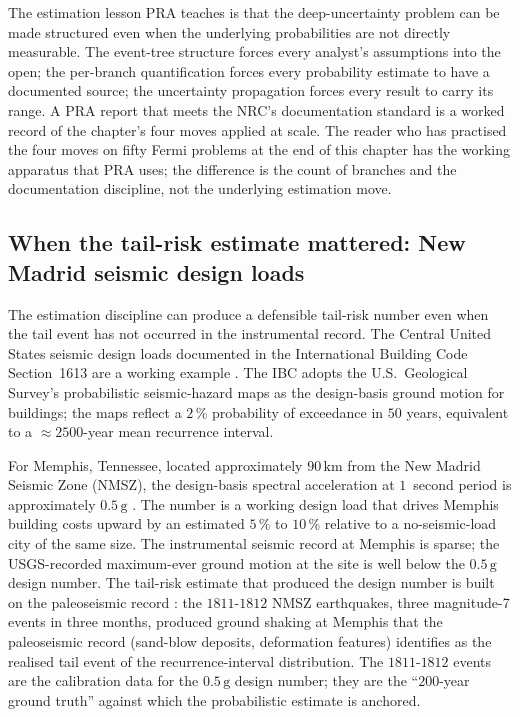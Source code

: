 The estimation lesson PRA teaches is that the deep-uncertainty
problem can be made structured even when the underlying
probabilities are not directly measurable. The event-tree
structure forces every analyst's assumptions into the open;
the per-branch quantification forces every probability
estimate to have a documented source; the uncertainty
propagation forces every result to carry its range. A PRA
report that meets the NRC's documentation standard is a
worked record of the chapter's four moves applied at scale.
The reader who has practised the four moves on fifty Fermi
problems at the end of this chapter has the working
apparatus that PRA uses; the difference is the count of
branches and the documentation discipline, not the underlying
estimation move.

\subsection{When the tail-risk estimate mattered: New Madrid
seismic design loads}

The estimation discipline can produce a defensible tail-risk
number even when the tail event has not occurred in the
instrumental record. The Central United States seismic
design loads documented in the International Building Code
Section~1613 are a working example
\cite{std:ch09t3-ibc-2018}. The IBC adopts the U.S.\
Geological Survey's probabilistic seismic-hazard maps as the
design-basis ground motion for buildings; the maps reflect a
$2\,\%$ probability of exceedance in $50$ years, equivalent
to a $\approx 2500$-year mean recurrence interval.

For Memphis, Tennessee, located approximately $90 \,\si{\kilo
\meter}$ from the New Madrid Seismic Zone (NMSZ), the
design-basis spectral acceleration at $1$~second period is
approximately $0.5 \,\text{g}$ \cite{std:ch09t3-ibc-2018}.
The number is a working design load that drives Memphis
building costs upward by an estimated $5\,\%$ to $10\,\%$
relative to a no-seismic-load city of the same size. The
instrumental seismic record at Memphis is sparse; the
USGS-recorded maximum-ever ground motion at the site is well
below the $0.5 \,\text{g}$ design number. The tail-risk
estimate that produced the design number is built on the
paleoseismic record \cite{text:ch09t3-tuttle-2002}: the
$1811$-$1812$ NMSZ earthquakes, three magnitude-7 events in
three months, produced ground shaking at Memphis that the
paleoseismic record (sand-blow deposits, deformation
features) identifies as the realised tail event of the
recurrence-interval distribution. The $1811$-$1812$ events
are the calibration data for the $0.5 \,\text{g}$ design
number; they are the ``$200$-year ground truth'' against which
the probabilistic estimate is anchored.

